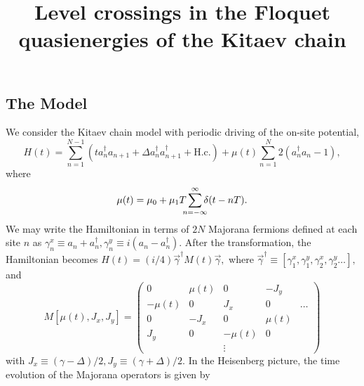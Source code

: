 \documentclass[11pt]{report}
\newcommand{\C}{a^{\dagger}}
\newcommand{\D}{a}
\newcommand{\Mv}{\vec{\gamma}}
\newcommand{\Mx}{\gamma^x}
\newcommand{\My}{\gamma^y}
\begin{document}
\title{Level crossings in the Floquet quasienergies of the Kitaev chain}
\maketitle

\subsection*{The Model}

We consider the Kitaev chain model\cite{Kitaev2001} with periodic driving of the on-site potential\cite{Dutta2013},
%
\begin{equation}
	H(t) = \sum_{n=1}^{N-1}( t\C_{n}\D_{n+1} + \Delta\C_{n}\C_{n+1} + \textrm{H.c.}) + \mu(t)\sum_{n=1}^{N} 2(\C_{n}\D_{n} - 1),
\end{equation}
%
where
%
\begin{equation}
	\mu(t) = \mu_0 + \mu_1 T \sum^{\infty}_{\mathclap{n=-\infty}} \delta(t-nT).
\end{equation}
%
We may write the Hamiltonian in terms of $2N$ Majorana fermions defined at each site $n$ as
$
\Mx_n \equiv \D_n+\C_n,
\My_n \equiv i(\D_n - \C_n).
$
After the transformation, the Hamiltonian becomes
$
H(t) = (i/4)\Mv^{\dagger} M(t) \Mv,
$
where
$
\Mv^{\dagger} \equiv [\Mx_1, \My_1, \Mx_2, \My_2 \dots],
$
and
%
\begin{equation}
		M[\mu(t),J_x,J_y] = \left(\begin{matrix}
		0 & \mu(t) & 0 & -J_y \\
		-\mu(t) & 0 & J_x & 0 & \dots \\
		0 & -J_x & 0 & \mu(t) \\
		J_y & 0 & -\mu(t) & 0\\
		 & & \vdots & 
	\end{matrix} \right)
\end{equation}	
%
with
$
J_x \equiv (\gamma-\Delta)/2, J_y \equiv (\gamma+\Delta)/2.
$
In the Heisenberg picture, the time evolution of the Majorana operators is given by
\end{document}
